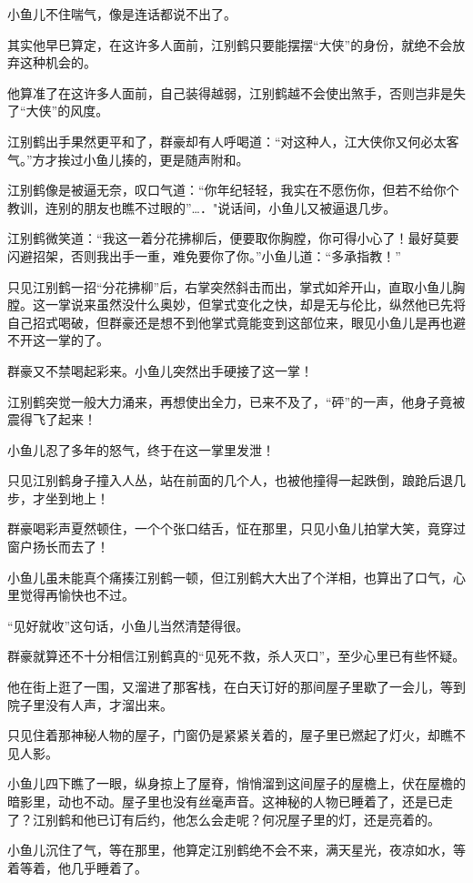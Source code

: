 \documentclass[12pt,oneside]{book}
\begin{document}
小鱼儿不住喘气，像是连话都说不出了。

其实他早巳算定，在这许多人面前，江别鹤只要能摆摆``大侠''的身份，就绝不会放弃这种机会的。

他算准了在这许多人面前，自己装得越弱，江别鹤越不会使出煞手，否则岂非是失了``大侠''的风度。

江别鹤出手果然更平和了，群豪却有人呼喝道：``对这种人，江大侠你又何必太客气。''方才挨过小鱼儿揍的，更是随声附和。

江别鹤像是被逼无奈，叹口气道：``你年纪轻轻，我实在不愿伤你，但若不给你个教训，连别的朋友也瞧不过眼的''\ldots．"说话间，小鱼儿又被逼退几步。

江别鹤微笑道：``我这一着分花拂柳后，便要取你胸膛，你可得小心了！最好莫要闪避招架，否则我出手一重，难免要你了你。''小鱼儿道：``多承指教！''

只见江别鹤一招``分花拂柳''后，右掌突然斜击而出，掌式如斧开山，直取小鱼儿胸膛。这一掌说来虽然没什么奥妙，但掌式变化之快，却是无与伦比，纵然他已先将自己招式喝破，但群豪还是想不到他掌式竟能变到这部位来，眼见小鱼儿是再也避不开这一掌的了。

群豪又不禁喝起彩来。小鱼儿突然出手硬接了这一掌！

江别鹤突觉一般大力涌来，再想使出全力，已来不及了，``砰''的一声，他身子竟被震得飞了起来！

小鱼儿忍了多年的怒气，终于在这一掌里发泄！

只见江别鹤身子撞入人丛，站在前面的几个人，也被他撞得一起跌倒，踉跄后退几步，才坐到地上！

群豪喝彩声夏然顿住，一个个张口结舌，怔在那里，只见小鱼儿拍掌大笑，竟穿过窗户扬长而去了！

小鱼儿虽未能真个痛揍江别鹤一顿，但江别鹤大大出了个洋相，也算出了口气，心里觉得再愉快也不过。

``见好就收''这句话，小鱼儿当然清楚得很。

群豪就算还不十分相信江别鹤真的``见死不救，杀人灭口''，至少心里已有些怀疑。

他在街上逛了一围，又溜进了那客栈，在白天订好的那间屋子里歇了一会儿，等到院子里没有人声，才溜出来。

只见住着那神秘人物的屋子，门窗仍是紧紧关着的，屋子里已燃起了灯火，却瞧不见人影。

小鱼儿四下瞧了一眼，纵身掠上了屋脊，悄悄溜到这间屋子的屋檐上，伏在屋檐的暗影里，动也不动。屋子里也没有丝毫声音。这神秘的人物已睡着了，还是已走了？江别鹤和他已订有后约，他怎么会走呢？何况屋子里的灯，还是亮着的。

小鱼儿沉住了气，等在那里，他算定江别鹤绝不会不来，满天星光，夜凉如水，等着等着，他几乎睡着了。
\end{document}
